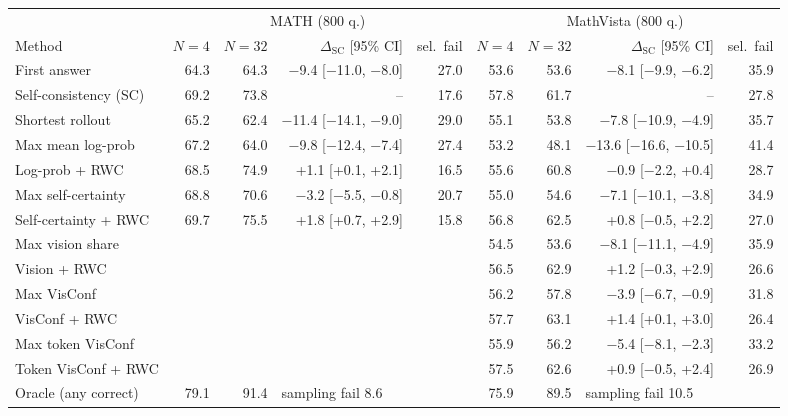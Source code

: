 \setlength{\tabcolsep}{3pt}
\begin{tabular}{@{}l rrrr rrrr@{}}
\toprule
 & \multicolumn{4}{c}{MATH (800 q.)} & \multicolumn{4}{c}{MathVista (800 q.)} \\ \cmidrule(lr){2-5} \cmidrule(lr){6-9}
Method & $N{=}4$ & $N{=}32$ & $\Delta_{\mathrm{SC}}$ [95\% CI] & sel.\ fail & $N{=}4$ & $N{=}32$ & $\Delta_{\mathrm{SC}}$ [95\% CI] & sel.\ fail \\
\midrule
First answer & 64.3 & 64.3 & $-$9.4 [$-$11.0, $-$8.0] & 27.0 & 53.6 & 53.6 & $-$8.1 [$-$9.9, $-$6.2] & 35.9 \\
Self-consistency (SC) & 69.2 & 73.8 & -- & 17.6 & 57.8 & 61.7 & -- & 27.8 \\
Shortest rollout & 65.2 & 62.4 & $-$11.4 [$-$14.1, $-$9.0] & 29.0 & 55.1 & 53.8 & $-$7.8 [$-$10.9, $-$4.9] & 35.7 \\
\addlinespace[2pt]
Max mean log-prob & 67.2 & 64.0 & $-$9.8 [$-$12.4, $-$7.4] & 27.4 & 53.2 & 48.1 & $-$13.6 [$-$16.6, $-$10.5] & 41.4 \\
Log-prob + RWC & 68.5 & 74.9 & +1.1 [+0.1, +2.1] & 16.5 & 55.6 & 60.8 & $-$0.9 [$-$2.2, +0.4] & 28.7 \\
Max self-certainty & 68.8 & 70.6 & $-$3.2 [$-$5.5, $-$0.8] & 20.7 & 55.0 & 54.6 & $-$7.1 [$-$10.1, $-$3.8] & 34.9 \\
Self-certainty + RWC & 69.7 & 75.5 & +1.8 [+0.7, +2.9] & 15.8 & 56.8 & 62.5 & +0.8 [$-$0.5, +2.2] & 27.0 \\
\addlinespace[2pt]
Max vision share & & & &  & 54.5 & 53.6 & $-$8.1 [$-$11.1, $-$4.9] & 35.9 \\
Vision + RWC & & & &  & 56.5 & 62.9 & +1.2 [$-$0.3, +2.9] & 26.6 \\
Max VisConf & & & &  & 56.2 & 57.8 & $-$3.9 [$-$6.7, $-$0.9] & 31.8 \\
VisConf + RWC & & & &  & 57.7 & 63.1 & +1.4 [+0.1, +3.0] & 26.4 \\
Max token VisConf & & & &  & 55.9 & 56.2 & $-$5.4 [$-$8.1, $-$2.3] & 33.2 \\
Token VisConf + RWC & & & &  & 57.5 & 62.6 & +0.9 [$-$0.5, +2.4] & 26.9 \\
\midrule
Oracle (any correct) & 79.1 & 91.4 & \multicolumn{2}{l}{sampling fail 8.6} & 75.9 & 89.5 & \multicolumn{2}{l}{sampling fail 10.5} \\
\bottomrule
\end{tabular}
